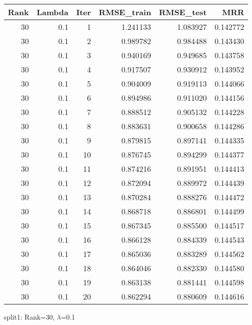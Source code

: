 \begin{tabular}{rrrrrr}
\toprule
 Rank &  Lambda &  Iter &  RMSE\_train &  RMSE\_test &       MRR \\
\midrule
   30 &     0.1 &     1 &    1.241133 &   1.083927 &  0.142772 \\
   30 &     0.1 &     2 &    0.989782 &   0.984488 &  0.143430 \\
   30 &     0.1 &     3 &    0.940169 &   0.949685 &  0.143758 \\
   30 &     0.1 &     4 &    0.917507 &   0.930912 &  0.143952 \\
   30 &     0.1 &     5 &    0.904009 &   0.919113 &  0.144066 \\
   30 &     0.1 &     6 &    0.894986 &   0.911020 &  0.144156 \\
   30 &     0.1 &     7 &    0.888512 &   0.905132 &  0.144228 \\
   30 &     0.1 &     8 &    0.883631 &   0.900658 &  0.144286 \\
   30 &     0.1 &     9 &    0.879815 &   0.897141 &  0.144335 \\
   30 &     0.1 &    10 &    0.876745 &   0.894299 &  0.144377 \\
   30 &     0.1 &    11 &    0.874216 &   0.891951 &  0.144413 \\
   30 &     0.1 &    12 &    0.872094 &   0.889972 &  0.144439 \\
   30 &     0.1 &    13 &    0.870284 &   0.888276 &  0.144472 \\
   30 &     0.1 &    14 &    0.868718 &   0.886801 &  0.144499 \\
   30 &     0.1 &    15 &    0.867345 &   0.885500 &  0.144517 \\
   30 &     0.1 &    16 &    0.866128 &   0.884339 &  0.144543 \\
   30 &     0.1 &    17 &    0.865036 &   0.883289 &  0.144562 \\
   30 &     0.1 &    18 &    0.864046 &   0.882330 &  0.144580 \\
   30 &     0.1 &    19 &    0.863138 &   0.881441 &  0.144598 \\
   30 &     0.1 &    20 &    0.862294 &   0.880609 &  0.144616 \\
\bottomrule
\end{tabular}

\caption{split1: Rank=30, $\lambda$=0.1}
